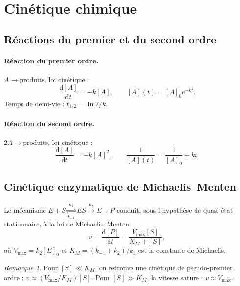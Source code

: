\documentclass[12pt,a4paper,openany]{book}
\theoremstyle{definition}
\theoremstyle{plain}
\theoremstyle{remark}
\newtheorem{remarque}[definition]{Remarque}
\newcommand{\dd}{\mathrm{d}}
\begin{document}
\section{Cinétique chimique}
\label{sec:cinetique}

\subsection{Réactions du premier et du second ordre}
\label{subsec:reactions-ordre}

\paragraph{Réaction du premier ordre.}
$A \to \text{produits}$, loi cinétique :
\begin{equation}
\label{eq:reaction-ordre1}
\frac{\dd [A]}{\dd t} = -k[A], \qquad
[A](t) = [A]_0 e^{-kt}.
\end{equation}
Temps de demi-vie : $t_{1/2} = \ln 2 / k$.

\paragraph{Réaction du second ordre.}
$2A \to \text{produits}$, loi cinétique :
\begin{equation}
\label{eq:reaction-ordre2}
\frac{\dd [A]}{\dd t} = -k[A]^2, \qquad
\frac{1}{[A](t)} = \frac{1}{[A]_0} + kt.
\end{equation}

\subsection{Cinétique enzymatique de Michaelis--Menten}
\label{subsec:michaelis-menten}

Le mécanisme $E + S \underset{k_{-1}}{\overset{k_1}{\rightleftharpoons}}
ES \overset{k_2}{\to} E + P$ conduit, sous l'hypothèse de
quasi-état stationnaire, à la loi de
Michaelis--Menten :
\begin{equation}
\label{eq:michaelis-menten}
v = \frac{\dd [P]}{\dd t}
= \frac{V_{\max}[S]}{K_M + [S]},
\end{equation}
où $V_{\max} = k_2[E]_0$ et
$K_M = (k_{-1} + k_2)/k_1$ est la constante de Michaelis.

\begin{remarque}
Pour $[S] \ll K_M$, on retrouve une cinétique de pseudo-premier
ordre : $v \approx (V_{\max}/K_M)[S]$. Pour $[S] \gg K_M$, la
vitesse sature : $v \approx V_{\max}$.
\end{remarque}
\end{document}
